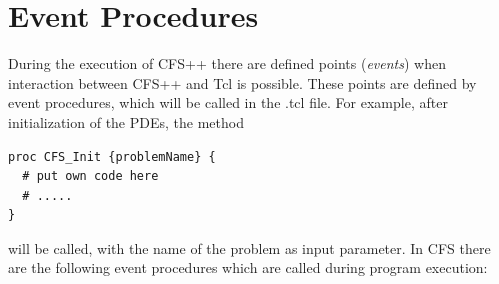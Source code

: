 \chapter{Event Procedures}
During the execution of CFS++ there are defined points ({\em events})
when interaction between CFS++ and Tcl is possible. These points are
defined by event procedures, which will be called in the .tcl
file. For example, after initialization of the PDEs, the method
\begin{verbatim}
proc CFS_Init {problemName} {
  # put own code here
  # .....
}
\end{verbatim}
will be called, with the name of the problem as input parameter. 
\newline
In CFS there are the following event procedures which are called
during program execution:

